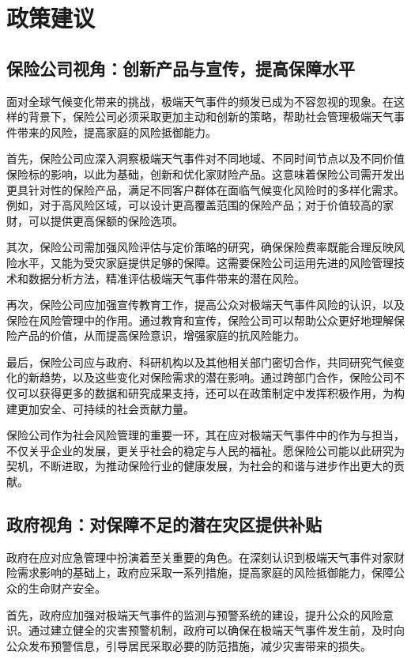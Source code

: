 \section{政策建议}
\subsection{保险公司视角：创新产品与宣传，提高保障水平}
面对全球气候变化带来的挑战，极端天气事件的频发已成为不容忽视的现象。在这样的背景下，保险公司必须采取更加主动和创新的策略，帮助社会管理极端天气事件带来的风险，提高家庭的风险抵御能力。

首先，保险公司应深入洞察极端天气事件对不同地域、不同时间节点以及不同价值保险标的影响，以此为基础，创新和优化家财险产品。这意味着保险公司需开发出更具针对性的保险产品，满足不同客户群体在面临气候变化风险时的多样化需求。例如，对于高风险区域，可以设计更高覆盖范围的保险产品；对于价值较高的家财，可以提供更高保额的保险选项。

其次，保险公司需加强风险评估与定价策略的研究，确保保险费率既能合理反映风险水平，又能为受灾家庭提供足够的保障。这需要保险公司运用先进的风险管理技术和数据分析方法，精准评估极端天气事件带来的潜在风险。

再次，保险公司应加强宣传教育工作，提高公众对极端天气事件风险的认识，以及保险在风险管理中的作用。通过教育和宣传，保险公司可以帮助公众更好地理解保险产品的价值，从而提高保险意识，增强家庭的抗风险能力。

最后，保险公司应与政府、科研机构以及其他相关部门密切合作，共同研究气候变化的新趋势，以及这些变化对保险需求的潜在影响。通过跨部门合作，保险公司不仅可以获得更多的数据和研究成果支持，还可以在政策制定中发挥积极作用，为构建更加安全、可持续的社会贡献力量。

保险公司作为社会风险管理的重要一环，其在应对极端天气事件中的作为与担当，不仅关乎企业的发展，更关乎社会的稳定与人民的福祉。愿保险公司能以此研究为契机，不断进取，为推动保险行业的健康发展，为社会的和谐与进步作出更大的贡献。

\subsection{政府视角：对保障不足的潜在灾区提供补贴}
政府在应对应急管理中扮演着至关重要的角色。在深刻认识到极端天气事件对家财险需求影响的基础上，政府应采取一系列措施，提高家庭的风险抵御能力，保障公众的生命财产安全。

首先，政府应加强对极端天气事件的监测与预警系统的建设，提升公众的风险意识。通过建立健全的灾害预警机制，政府可以确保在极端天气事件发生前，及时向公众发布预警信息，引导居民采取必要的防范措施，减少灾害带来的损失。

